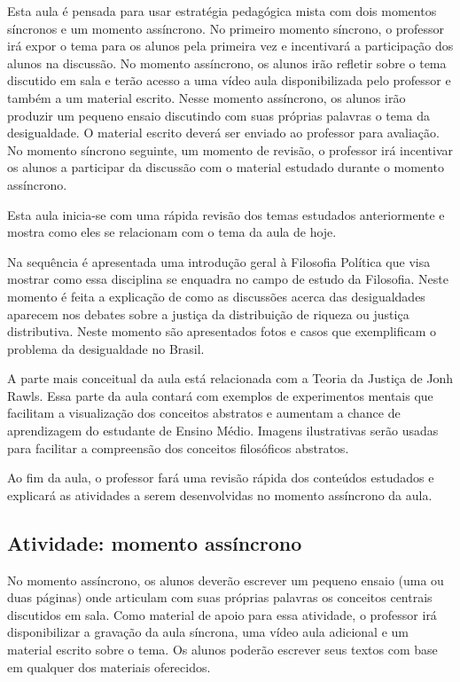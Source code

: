 \documentclass[
	article,			%
	12pt,				%
	twoside,			%
	a4paper,			%
	english,			%
	brazil,				%
	sumario=tradicional
]{abntex2-modelo-plano-de-aula}
\begin{document}
Esta aula é pensada para usar estratégia pedagógica mista com dois momentos síncronos e um momento assíncrono. No primeiro momento síncrono, o professor irá expor o tema para os alunos pela primeira vez e incentivará a participação dos alunos na discussão. No momento assíncrono, os alunos irão refletir sobre o tema discutido em sala e terão acesso a uma vídeo aula disponibilizada pelo professor e também a um material escrito. Nesse momento assíncrono, os alunos irão produzir um pequeno ensaio discutindo com suas próprias palavras o tema da desigualdade. O material escrito deverá ser enviado ao professor para avaliação. No momento síncrono seguinte, um momento de revisão, o professor irá incentivar os alunos a participar da discussão com o material estudado durante o momento assíncrono.

Esta aula inicia-se com uma rápida revisão dos temas estudados anteriormente e mostra como eles se relacionam com o tema da aula de hoje.

Na sequência é apresentada uma introdução geral à Filosofia Política que visa mostrar como essa disciplina se enquadra no campo de estudo da Filosofia. Neste momento é feita a explicação de como as discussões acerca das desigualdades aparecem nos debates sobre a justiça da distribuição de riqueza ou justiça distributiva. Neste momento são apresentados fotos e casos que exemplificam o problema da desigualdade no Brasil.

A parte mais conceitual da aula está relacionada com a Teoria da Justiça de Jonh Rawls. Essa parte da aula contará com exemplos de experimentos mentais que facilitam a visualização dos conceitos abstratos e aumentam a chance de aprendizagem do estudante de Ensino Médio. Imagens ilustrativas serão usadas para facilitar a compreensão dos conceitos filosóficos abstratos.

Ao fim da aula, o professor fará uma revisão rápida dos conteúdos estudados e explicará as atividades a serem desenvolvidas no momento assíncrono da aula.

\begin{snugshade}
	\section{Atividade: momento assíncrono} %
\end{snugshade}

No momento assíncrono, os alunos deverão escrever um pequeno ensaio (uma ou duas páginas) onde articulam com suas próprias palavras os conceitos centrais discutidos em sala. Como material de apoio para essa atividade, o professor irá disponibilizar a gravação da aula síncrona, uma vídeo aula adicional e um material escrito sobre o tema. Os alunos poderão escrever seus textos com base em qualquer dos materiais oferecidos.
\end{document}
